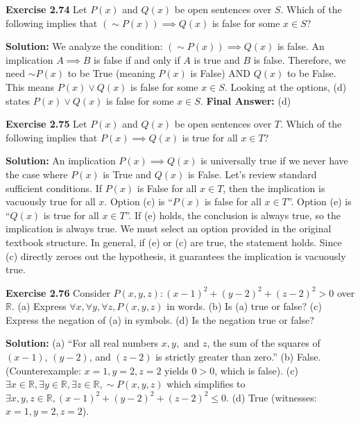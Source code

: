 \documentclass[12pt]{article}
\begin{document}
\textbf{Exercise 2.74}
Let $P(x)$ and $Q(x)$ be open sentences over $S$. Which of the following implies that $(\sim P(x)) \implies Q(x)$ is false for some $x \in S$?
\begin{mdframed}
\textbf{Solution:}
We analyze the condition: $(\sim P(x)) \implies Q(x)$ is false. An implication $A \implies B$ is false if and only if $A$ is true and $B$ is false. Therefore, we need $\sim P(x)$ to be True (meaning $P(x)$ is False) AND $Q(x)$ to be False. This means $P(x) \lor Q(x)$ is false for some $x \in S$.
Looking at the options, (d) states $P(x) \lor Q(x)$ is false for some $x \in S$.
\textbf{Final Answer:} (d)
\end{mdframed}

\textbf{Exercise 2.75}
Let $P(x)$ and $Q(x)$ be open sentences over $T$. Which of the following implies that $P(x) \implies Q(x)$ is true for all $x \in T$?
\begin{mdframed}
\textbf{Solution:}
An implication $P(x) \implies Q(x)$ is universally true if we never have the case where $P(x)$ is True and $Q(x)$ is False. 
Let's review standard sufficient conditions. If $P(x)$ is False for all $x \in T$, then the implication is vacuously true for all $x$. Option (c) is ``$P(x)$ is false for all $x \in T$''. Option (e) is ``$Q(x)$ is true for all $x \in T$''. If (e) holds, the conclusion is always true, so the implication is always true. We must select an option provided in the original textbook structure. In general, if (e) or (c) are true, the statement holds. Since (c) directly zeroes out the hypothesis, it guarantees the implication is vacuously true.
\end{mdframed}

\textbf{Exercise 2.76}
Consider $P(x,y,z): (x - 1)^2 + (y - 2)^2 + (z - 2)^2 > 0$ over $\mathbb{R}$.
(a) Express $\forall x, \forall y, \forall z, P(x,y,z)$ in words.
(b) Is (a) true or false?
(c) Express the negation of (a) in symbols.
(d) Is the negation true or false?
\begin{mdframed}
\textbf{Solution:}
(a) ``For all real numbers $x, y, \text{ and } z$, the sum of the squares of $(x-1)$, $(y-2)$, and $(z-2)$ is strictly greater than zero.''
(b) False. (Counterexample: $x=1, y=2, z=2$ yields $0 > 0$, which is false).
(c) $\exists x \in \mathbb{R}, \exists y \in \mathbb{R}, \exists z \in \mathbb{R}, \sim P(x,y,z)$ which simplifies to $\exists x,y,z \in \mathbb{R}, (x-1)^2 + (y-2)^2 + (z-2)^2 \le 0$.
(d) True (witnesses: $x=1, y=2, z=2$).
\end{mdframed}
\end{document}
